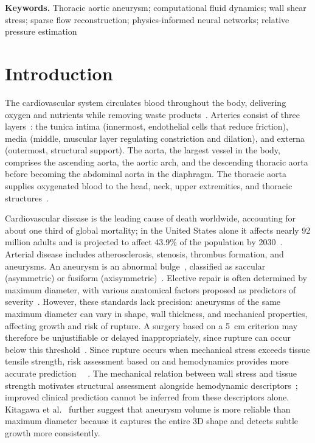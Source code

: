 \documentclass[12pt,a4paper]{article}
\newcommand{\cfdrevision}[1]{#1} %
\newcommand{\WSS}{\ac{wss}\xspace}
\theoremstyle{definition}
\numberwithin{equation}{section}
\providecommand{\DIFaddtex}[1]{{\protect\color{blue} \sf #1}} %
\providecommand{\DIFdeltex}[1]{{\protect\color{red} \scriptsize #1}} %
\providecommand{\DIFaddbegin}{} %
\providecommand{\DIFaddend}{} %
\providecommand{\DIFdelbegin}{} %
\providecommand{\DIFdelend}{} %
\providecommand{\DIFadd}[1]{\texorpdfstring{\DIFaddtex{#1}}{#1}} %
\providecommand{\DIFdel}[1]{\texorpdfstring{\DIFdeltex{#1}}{}} %
\newcommand{\DIFscaledelfig}{0.5}
\newlength{\DIFdelgraphicswidth} %
\newlength{\DIFdelgraphicsheight} %
\newcommand{\DIFaddincludegraphics}[2][]{{\color{blue}\fbox{\DIFOincludegraphics[#1]{#2}}}} %
\newcommand{\DIFdelincludegraphics}[2][]{%
\sbox{\DIFdelgraphicsbox}{\DIFOincludegraphics[#1]{#2}}%
\settoboxwidth{\DIFdelgraphicswidth}{\DIFdelgraphicsbox} %
\settoboxtotalheight{\DIFdelgraphicsheight}{\DIFdelgraphicsbox} %
\scalebox{\DIFscaledelfig}{%
\parbox[b]{\DIFdelgraphicswidth}{\usebox{\DIFdelgraphicsbox}\\[-\baselineskip] \rule{\DIFdelgraphicswidth}{0em}}\llap{\resizebox{\DIFdelgraphicswidth}{\DIFdelgraphicsheight}{%
\setlength{\unitlength}{\DIFdelgraphicswidth}%
\begin{picture}(1,1)%
\thicklines\linethickness{2pt} %
{\color[rgb]{1,0,0}\put(0,0){\framebox(1,1){}}}%
{\color[rgb]{1,0,0}\put(0,0){\line( 1,1){1}}}%
{\color[rgb]{1,0,0}\put(0,1){\line(1,-1){1}}}%
\end{picture}%
}\hspace*{3pt}}} %
} %
\DeclareRobustCommand{\DIFaddbegin}{\DIFOaddbegin \let\includegraphics\DIFaddincludegraphics} %
\DeclareRobustCommand{\DIFaddend}{\DIFOaddend \let\includegraphics\DIFOincludegraphics} %
\DeclareRobustCommand{\DIFdelbegin}{\DIFOdelbegin \let\includegraphics\DIFdelincludegraphics} %
\DeclareRobustCommand{\DIFdelend}{\DIFOaddend \let\includegraphics\DIFOincludegraphics} %
\begin{document}
\acresetall

\noindent\textbf{Keywords.} Thoracic aortic aneurysm; computational fluid dynamics; wall shear stress; sparse flow reconstruction; physics-informed neural networks; relative pressure estimation


\section{Introduction}
\label{sec:introduction}

The cardiovascular system circulates blood throughout the body, delivering oxygen and nutrients while removing waste products~\cite{heymans1960reflexogenic}. Arteries consist of three layers~\cite{holzapfel2010modelling}: the tunica intima (innermost, endothelial cells that reduce friction), media (middle, muscular layer regulating constriction and dilation), and externa (outermost, structural support). The aorta, the largest vessel in the body, comprises the ascending aorta, the aortic arch, and the descending thoracic aorta before becoming the abdominal aorta in the diaphragm. The thoracic aorta supplies oxygenated blood to the head, neck, upper extremities, and thoracic structures~\cite{tran2018anatomy}.

Cardiovascular disease is the leading cause of death worldwide, accounting for about one third of global mortality; in the United States alone it affects nearly 92 million adults and is projected to affect 43.9\% of the population by 2030~\cite{Randles_CFD_2017}. Arterial disease includes atherosclerosis, stenosis, thrombus formation, and aneurysms. An aneurysm is an abnormal bulge~\cite{Les_et_al_2010}, classified as saccular (asymmetric) or fusiform (axisymmetric)~\cite{sakalihasan2018abdominal}. Elective repair is often determined by maximum diameter, with various anatomical factors proposed as predictors of severity~\cite{cronenwett1990variables, lipp2020computational}. However, these standards lack precision: aneurysms of the same maximum diameter can vary in shape, wall thickness, and mechanical properties, affecting growth and risk of rupture. A surgery based on a 5~cm criterion may therefore be unjustifiable or delayed inappropriately, since rupture can occur below this threshold~\cite{darling1977autopsy, belkacemi2022flow}. \DIFdelbegin \DIFdel{Since rupture occurs when mechanical stress exceeds tissue tensile strength, risk assessment based on }%
\DIFdel{and hemodynamics provides more accurate prediction~\mbox{%
\cite{bilgi2020effects, vorp1998mechanical}}\hskip0pt%
. }\DIFdelend \DIFaddbegin \DIFadd{\cfdrevision{The mechanical relation between wall stress and tissue strength motivates structural assessment alongside hemodynamic descriptors~\cite{bilgi2020effects, vorp1998mechanical}; improved clinical prediction cannot be inferred from these descriptors alone.} }\DIFaddend Kitagawa et al.~\cite{kitagawa2013role} further suggest that aneurysm volume is more reliable than maximum diameter because it captures the entire 3D shape and detects subtle growth more consistently.
\end{document}
